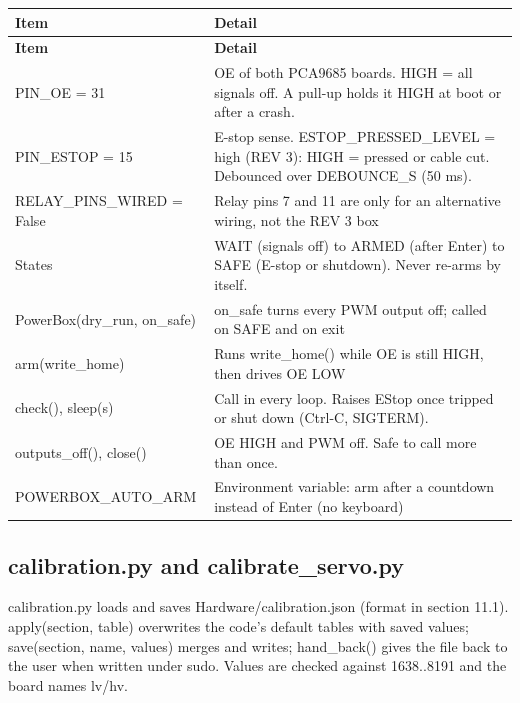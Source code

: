 \documentclass[11pt,letterpaper]{article}
\newcommand{\code}[1]{\textcolor{codeblue}{\ttfamily\smaller\relax #1}}
\begin{document}
{\small
\begin{longtable}{|>{\raggedright\arraybackslash}p{}|>{\raggedright\arraybackslash}p{}|}
\hline
\rowcolor{tblhead}\textbf{Item} & \textbf{Detail} \\ \hline
\endfirsthead
\hline
\rowcolor{tblhead}\textbf{Item} & \textbf{Detail} \\ \hline
\endhead
\code{PIN\_\allowbreak{}OE =\allowbreak{} 31} & OE of both PCA9685 boards. HIGH = all signals off. A pull-up holds it HIGH at boot or after a crash. \\ \hline
\code{PIN\_\allowbreak{}ESTOP =\allowbreak{} 15} & E-stop sense. \code{ESTOP\_\allowbreak{}PRESSED\_\allowbreak{}LEVEL =\allowbreak{} \textquotedbl{}high\textquotedbl{}} (REV 3): HIGH = pressed or cable cut. Debounced over \code{DEBOUNCE\_\allowbreak{}S} (50 ms). \\ \hline
\code{RELAY\_\allowbreak{}PINS\_\allowbreak{}WIRED =\allowbreak{} False} & Relay pins 7 and 11 are only for an alternative wiring, not the REV 3 box \\ \hline
States & WAIT (signals off) to ARMED (after Enter) to SAFE (E-stop or shutdown). Never re-arms by itself. \\ \hline
\code{PowerBox(dry\_\allowbreak{}run,\allowbreak{} on\_\allowbreak{}safe)} & \code{on\_\allowbreak{}safe} turns every PWM output off; called on SAFE and on exit \\ \hline
\code{arm(write\_\allowbreak{}home)} & Runs \code{write\_\allowbreak{}home()} while OE is still HIGH, then drives OE LOW \\ \hline
\code{check()}, \code{sleep(s)} & Call in every loop. Raises \code{EStop} once tripped or shut down (Ctrl-C, SIGTERM). \\ \hline
\code{outputs\_\allowbreak{}off()}, \code{close()} & OE HIGH and PWM off. Safe to call more than once. \\ \hline
\code{POWERBOX\_\allowbreak{}AUTO\_\allowbreak{}ARM} & Environment variable: arm after a countdown instead of Enter (no keyboard) \\ \hline
\end{longtable}}


\subsection{calibration.py and calibrate\_servo.py}
\code{calibration.py} loads and saves \code{Hardware/\allowbreak{}calibration.json} (format in section 11.1). \code{apply(section,\allowbreak{} table)} overwrites the code's default tables with saved values; \code{save(section,\allowbreak{} name,\allowbreak{} values)} merges and writes; \code{hand\_\allowbreak{}back()} gives the file back to the user when written under sudo. Values are checked against 1638..8191 and the board names \code{lv}/\code{hv}.
\end{document}
